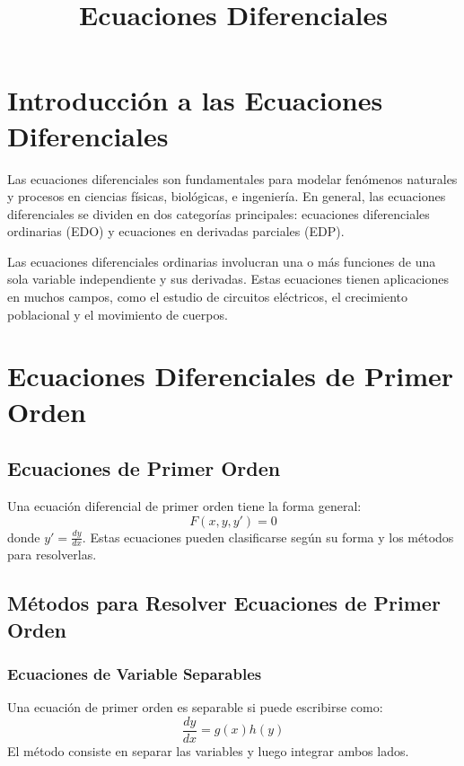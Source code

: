 \documentclass{article}
\title{Ecuaciones Diferenciales}
\author{}
\date{}
\begin{document}
\maketitle

\tableofcontents
\newpage

\section{Introducción a las Ecuaciones Diferenciales}

Las ecuaciones diferenciales son fundamentales para modelar fenómenos naturales y procesos en ciencias físicas, biológicas, e ingeniería. En general, las ecuaciones diferenciales se dividen en dos categorías principales: ecuaciones diferenciales ordinarias (EDO) y ecuaciones en derivadas parciales (EDP). 

Las ecuaciones diferenciales ordinarias involucran una o más funciones de una sola variable independiente y sus derivadas. Estas ecuaciones tienen aplicaciones en muchos campos, como el estudio de circuitos eléctricos, el crecimiento poblacional y el movimiento de cuerpos.


\section{Ecuaciones Diferenciales de Primer Orden}

\subsection{Ecuaciones de Primer Orden}
Una ecuación diferencial de primer orden tiene la forma general:
\[
F(x, y, y') = 0
\]
donde \( y' = \frac{dy}{dx} \). Estas ecuaciones pueden clasificarse según su forma y los métodos para resolverlas.

\subsection{Métodos para Resolver Ecuaciones de Primer Orden}

\subsubsection{Ecuaciones de Variable Separables}
Una ecuación de primer orden es separable si puede escribirse como:
\[
\frac{dy}{dx} = g(x)h(y)
\]
El método consiste en separar las variables y luego integrar ambos lados.
\end{document}
